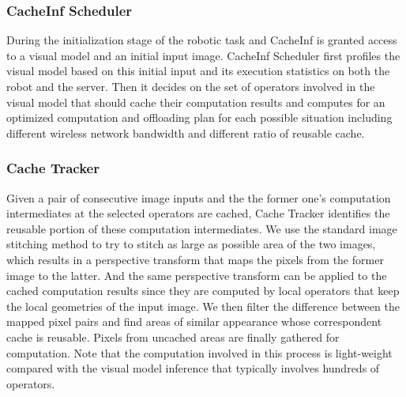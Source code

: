 \subsubsection{CacheInf Scheduler}
During the initialization stage of the robotic task and CacheInf is granted access to a visual model and an initial input image.
CacheInf Scheduler first profiles the visual model based on this initial input and its execution statistics on both the robot and the server.
Then it decides on the set of operators involved in the visual model that should cache their computation results and computes for an optimized computation and offloading plan for each possible situation including different wireless network bandwidth and different ratio of reusable cache.

\subsubsection{Cache Tracker}
Given a pair of consecutive image inputs and the the former one's computation intermediates at the selected operators are cached, Cache Tracker identifies the reusable portion of these computation intermediates.
We use the standard image stitching method to try to stitch as large as possible area of the two images, which results in a perspective transform that maps the pixels from the former image to the latter.
And the same perspective transform can be applied to the cached computation results since they are computed by local operators that keep the local geometries of the input image.
We then filter the difference between the mapped pixel pairs and find areas of similar appearance whose correspondent cache is reusable.
Pixels from uncached areas are finally gathered for computation.
Note that the computation involved in this process is light-weight compared with the visual model inference that typically involves hundreds of operators.

